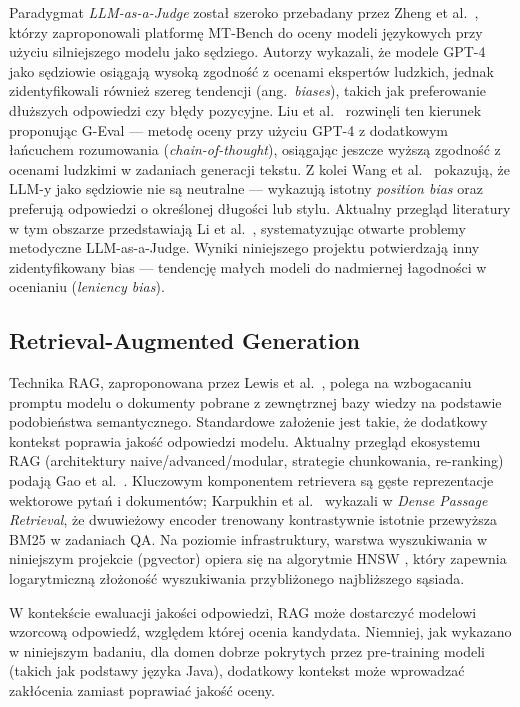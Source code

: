 \documentclass[12pt, a4paper]{article}
\begin{document}
Paradygmat \textit{LLM-as-a-Judge} został szeroko przebadany przez Zheng et al.\ \cite{zheng2023judging},
którzy zaproponowali platformę MT-Bench do oceny modeli językowych przy użyciu silniejszego
modelu jako sędziego. Autorzy wykazali, że modele GPT-4 jako sędziowie osiągają wysoką
zgodność z ocenami ekspertów ludzkich, jednak zidentyfikowali również szereg tendencji
(ang.\ \textit{biases}), takich jak preferowanie dłuższych odpowiedzi czy błędy pozycyjne.
Liu et al.\ \cite{liu2023geval} rozwinęli ten kierunek proponując G-Eval — metodę
oceny przy użyciu GPT-4 z dodatkowym łańcuchem rozumowania (\textit{chain-of-thought}),
osiągając jeszcze wyższą zgodność z ocenami ludzkimi w zadaniach generacji tekstu.
Z kolei Wang et al.\ \cite{wang2023fair} pokazują, że LLM-y jako sędziowie nie są
neutralne — wykazują istotny \textit{position bias} oraz preferują odpowiedzi
o określonej długości lub stylu. Aktualny przegląd literatury w tym obszarze
przedstawiają Li et al.\ \cite{li2024llmeval}, systematyzując otwarte problemy
metodyczne LLM-as-a-Judge.
Wyniki niniejszego projektu potwierdzają inny zidentyfikowany bias — tendencję
małych modeli do nadmiernej łagodności w ocenianiu (\textit{leniency bias}).

\subsection{Retrieval-Augmented Generation}

Technika RAG, zaproponowana przez Lewis et al.\ \cite{lewis2020rag}, polega na wzbogacaniu
promptu modelu o dokumenty pobrane z zewnętrznej bazy wiedzy na podstawie podobieństwa
semantycznego. Standardowe założenie jest takie, że dodatkowy kontekst poprawia jakość
odpowiedzi modelu. Aktualny przegląd ekosystemu RAG (architektury naive/advanced/modular,
strategie chunkowania, re-ranking) podają Gao et al.\ \cite{gao2024ragsurvey}.
Kluczowym komponentem retrievera są gęste reprezentacje wektorowe pytań i dokumentów;
Karpukhin et al.\ \cite{karpukhin2020dpr} wykazali w \textit{Dense Passage Retrieval},
że dwuwieżowy encoder trenowany kontrastywnie istotnie przewyższa BM25 w zadaniach QA.
Na poziomie infrastruktury, warstwa wyszukiwania w niniejszym projekcie (pgvector)
opiera się na algorytmie HNSW \cite{malkov2020hnsw}, który zapewnia logarytmiczną
złożoność wyszukiwania przybliżonego najbliższego sąsiada.

W kontekście ewaluacji jakości odpowiedzi, RAG może dostarczyć modelowi wzorcową odpowiedź,
względem której ocenia kandydata. Niemniej, jak wykazano w niniejszym badaniu,
dla domen dobrze pokrytych przez pre-training modeli (takich jak podstawy języka Java),
dodatkowy kontekst może wprowadzać zakłócenia zamiast poprawiać jakość oceny.
\end{document}
